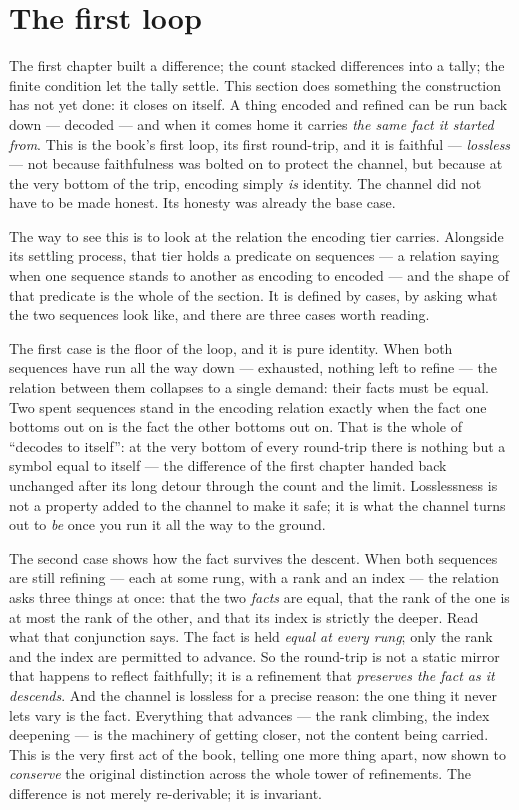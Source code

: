 \section{The first loop}

The first chapter built a difference; the count stacked differences into a tally; the finite condition let the tally
settle. This section does something the construction has not yet done: it closes on itself. A thing encoded and
refined can be run back down --- decoded --- and when it comes home it carries \emph{the same fact it started from}.
This is the book's first loop, its first round-trip, and it is faithful --- \emph{lossless} --- not because
faithfulness was bolted on to protect the channel, but because at the very bottom of the trip, encoding simply
\emph{is} identity. The channel did not have to be made honest. Its honesty was already the base case.

The way to see this is to look at the relation the encoding tier carries. Alongside its settling process, that tier
holds a predicate on sequences --- a relation saying when one sequence stands to another as encoding to encoded ---
and the shape of that predicate is the whole of the section. It is defined by cases, by asking what the two sequences
look like, and there are three cases worth reading.

The first case is the floor of the loop, and it is pure identity. When both sequences have run all the way down ---
exhausted, nothing left to refine --- the relation between them collapses to a single demand: their facts must be
equal. Two spent sequences stand in the encoding relation exactly when the fact one bottoms out on is the fact the
other bottoms out on. That is the whole of ``decodes to itself'': at the very bottom of every round-trip there is
nothing but a symbol equal to itself --- the difference of the first chapter handed back unchanged after its long
detour through the count and the limit. Losslessness is not a property added to the channel to make it safe; it is
what the channel turns out to \emph{be} once you run it all the way to the ground.

The second case shows how the fact survives the descent. When both sequences are still refining --- each at some rung,
with a rank and an index --- the relation asks three things at once: that the two \emph{facts} are equal, that the
rank of the one is at most the rank of the other, and that its index is strictly the deeper. Read what that
conjunction says. The fact is held \emph{equal at every rung}; only the rank and the index are permitted to advance.
So the round-trip is not a static mirror that happens to reflect faithfully; it is a refinement that \emph{preserves
the fact as it descends}. And the channel is lossless for a precise reason: the one thing it never lets vary is the
fact. Everything that advances --- the rank climbing, the index deepening --- is the machinery of getting closer, not
the content being carried. This is the very first act of the book, telling one more thing apart, now shown to
\emph{conserve} the original distinction across the whole tower of refinements. The difference is not merely
re-derivable; it is invariant.

